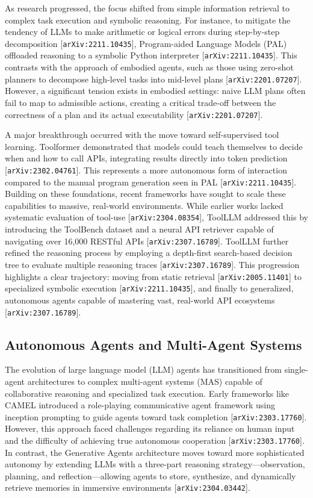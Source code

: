\documentclass[11pt]{article}
\begin{document}
As research progressed, the focus shifted from simple information retrieval to complex task execution and symbolic reasoning. For instance, to mitigate the tendency of LLMs to make arithmetic or logical errors during step-by-step decomposition [\texttt{arXiv:2211.10435}], Program-aided Language Models (PAL) offloaded reasoning to a symbolic Python interpreter [\texttt{arXiv:2211.10435}]. This contrasts with the approach of embodied agents, such as those using zero-shot planners to decompose high-level tasks into mid-level plans [\texttt{arXiv:2201.07207}]. However, a significant tension exists in embodied settings: naive LLM plans often fail to map to admissible actions, creating a critical trade-off between the correctness of a plan and its actual executability [\texttt{arXiv:2201.07207}].

A major breakthrough occurred with the move toward self-supervised tool learning. Toolformer demonstrated that models could teach themselves to decide when and how to call APIs, integrating results directly into token prediction [\texttt{arXiv:2302.04761}]. This represents a more autonomous form of interaction compared to the manual program generation seen in PAL [\texttt{arXiv:2211.10435}]. Building on these foundations, recent frameworks have sought to scale these capabilities to massive, real-world environments. While earlier works lacked systematic evaluation of tool-use [\texttt{arXiv:2304.08354}], ToolLLM addressed this by introducing the ToolBench dataset and a neural API retriever capable of navigating over 16,000 RESTful APIs [\texttt{arXiv:2307.16789}]. ToolLLM further refined the reasoning process by employing a depth-first search-based decision tree to evaluate multiple reasoning traces [\texttt{arXiv:2307.16789}]. This progression highlights a clear trajectory: moving from static retrieval [\texttt{arXiv:2005.11401}] to specialized symbolic execution [\texttt{arXiv:2211.10435}], and finally to generalized, autonomous agents capable of mastering vast, real-world API ecosystems [\texttt{arXiv:2307.16789}].

\subsection{Autonomous Agents and Multi-Agent Systems}

The evolution of large language model (LLM) agents has transitioned from single-agent architectures to complex multi-agent systems (MAS) capable of collaborative reasoning and specialized task execution. Early frameworks like CAMEL introduced a role-playing communicative agent framework using inception prompting to guide agents toward task completion [\texttt{arXiv:2303.17760}]. However, this approach faced challenges regarding its reliance on human input and the difficulty of achieving true autonomous cooperation [\texttt{arXiv:2303.17760}]. In contrast, the Generative Agents architecture moves toward more sophisticated autonomy by extending LLMs with a three-part reasoning strategy—observation, planning, and reflection—allowing agents to store, synthesize, and dynamically retrieve memories in immersive environments [\texttt{arXiv:2304.03442}].
\end{document}
